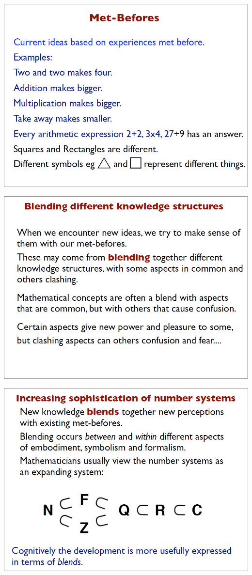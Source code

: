 \documentclass{article}
\begin{document}
\begin{minipage}[t]{0.32\linewidth}
	\includegraphics[width=1\textwidth]{david_tall/dt12.png}%
	
	\includegraphics[width=1\textwidth]{david_tall/dt15.png}%
	
	\includegraphics[width=1\textwidth]{david_tall/dt18.png}%
\end{minipage}
\end{document}
